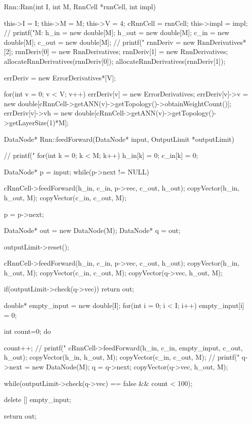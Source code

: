 Rnn::Rnn(int I, int M, RnnCell *rnnCell, int impl){

  this->I = I;
  this->M = M;
  this->V = 4;
  cRnnCell = rnnCell;
  this->impl = impl;
  // printf("M:%
  h\_in = new double[M];
  h\_out = new double[M];
  c\_in = new double[M];
  c\_out = new double[M];
  // printf("%
  rnnDeriv = new RnnDerivatives*[2];
  rnnDeriv[0] = new RnnDerivatives;
  rnnDeriv[1] = new RnnDerivatives;
  allocateRnnDerivatives(rnnDeriv[0]);
  allocateRnnDerivatives(rnnDeriv[1]);

  errDeriv = new ErrorDerivatives*[V];

  for(int v = 0; v < V; v++){
    errDeriv[v] = new ErrorDerivatives;
    errDeriv[v]->v = new double[cRnnCell->getANN(v)->getTopology()->obtainWeightCount()];
    errDeriv[v]->vh = new double[cRnnCell->getANN(v)->getTopology()->getLayerSize(1)*M];
  }
}

DataNode* Rnn::feedForward(DataNode* input, OutputLimit *outputLimit){
  // printf("%
  for(int k = 0; k < M; k++){
    h\_in[k] = 0;
    c\_in[k] = 0;
  }

  DataNode* p = input;
  while(p->next != NULL){


    cRnnCell->feedForward(h\_in, c\_in, p->vec, c\_out, h\_out);
    copyVector(h\_in, h\_out, M);
    copyVector(c\_in, c\_out, M);

    p = p->next;
  }

  DataNode* out = new DataNode(M);
  DataNode* q = out;

  outputLimit->reset();

  cRnnCell->feedForward(h\_in, c\_in, p->vec, c\_out, h\_out);
  copyVector(h\_in, h\_out, M);
  copyVector(c\_in, c\_out, M);
  copyVector(q->vec, h\_out, M);

  if(outputLimit->check(q->vec)) return out;

 double* empty\_input = new double[I];
 for(int i = 0; i < I; i++)
  empty\_input[i] = 0;


  int count=0;
  do{
    count++;
    // printf("%
    cRnnCell->feedForward(h\_in, c\_in, empty\_input, c\_out, h\_out);
    copyVector(h\_in, h\_out, M);
    copyVector(c\_in, c\_out, M);
    // printf("%
    q->next = new DataNode(M);
    q = q->next;
    copyVector(q->vec, h\_out, M);




  }while(outputLimit->check(q->vec) == false \&\& count < 100);

  delete [] empty\_input;

  return out;
}

